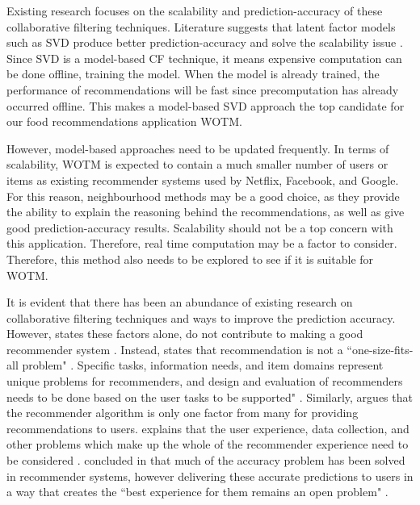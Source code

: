 
Existing research focuses on the scalability and prediction-accuracy of these collaborative filtering techniques. Literature suggests that latent factor models such as SVD produce better prediction-accuracy and solve the scalability issue . Since SVD is a model-based CF technique, it means expensive computation can be done offline, training the model. When the model is already trained, the performance of recommendations will be fast  since precomputation has already occurred offline. This makes a model-based SVD approach the top candidate for our food recommendations application WOTM. 

However, model-based approaches need to be updated frequently. In terms of scalability, WOTM is expected to contain a much smaller number of users or items as existing recommender systems used by Netflix, Facebook, and Google. For this reason, neighbourhood methods may be a good choice, as they provide the ability to explain the reasoning behind the recommendations, as well as give good prediction-accuracy results. Scalability should not be a top concern with this application. Therefore, real time computation may be a factor to consider. Therefore, this method also needs to be explored to see if it is suitable for WOTM.

It is evident that there has been an abundance of existing research on collaborative filtering techniques and ways to improve the prediction accuracy. However, \citeauthor{schafer2007collaborative} states these factors alone, do not contribute to making a good recommender system \cite{schafer2007collaborative}. Instead, \citeauthor{schafer2007collaborative} states that recommendation is not a ``one-size-fits-all problem"  \cite{schafer2007collaborative}. Specific tasks, information needs, and item domains represent unique problems for recommenders, and design and evaluation of recommenders needs to be done based on the user tasks to be supported" \cite{schafer2007collaborative}. Similarly, \citeauthor{martin2009recsys} argues that the recommender algorithm is only one factor from many for providing recommendations to users. \citeauthor{martin2009recsys} explains that the user experience, data collection, and other problems which make up the whole of the recommender experience need to be considered \cite{schafer2007collaborative, martin2009recsys}. \citeauthor{interface} concluded in \cite{interface} that much of the accuracy problem has been solved in recommender systems, however delivering these accurate predictions to users in a way that creates the ``best experience for them remains an open problem" \cite{interface}. 

